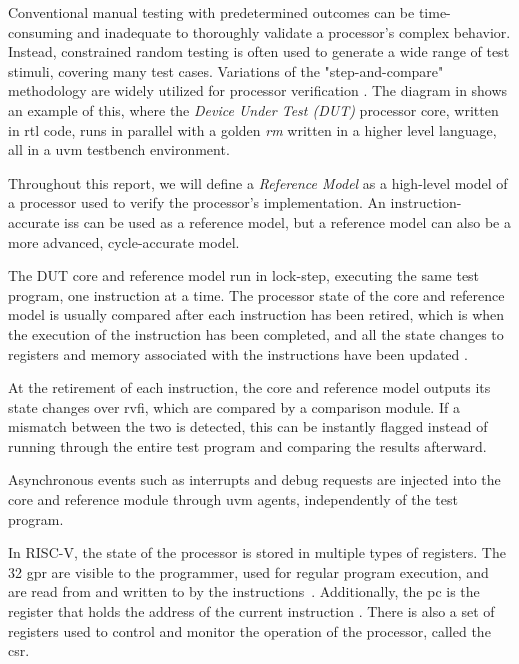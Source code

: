 Conventional manual testing with predetermined outcomes can be time-consuming and inadequate to thoroughly validate a processor's complex behavior. Instead, constrained random testing is often used to generate a wide range of test stimuli, covering many test cases. Variations of the "step-and-compare" methodology are widely utilized for processor verification \cite{taylorAdvancedRISCVVerification2023}. The diagram in  shows an example of this, where the \textit{Device Under Test (DUT)} processor core, written in \acrfull{rtl} code, runs in parallel with a golden \textit{\gls{rm}} written in a higher level language, all in a \acrfull{uvm} testbench environment. 

Throughout this report, we will define a \textit{Reference Model} as a high-level model of a processor used to verify the processor's implementation. An instruction-accurate \acrfull{iss} can be used as a reference model, but a reference model can also be a more advanced, cycle-accurate model. 

The DUT core and reference model run in lock-step, executing the same test program, one instruction at a time. 
The processor state of the core and reference model is usually compared after each instruction has been \gls{retired}, which is when the execution of the instruction has been completed, and all the state changes to registers and memory associated with the instructions have been updated \cite{taylorAdvancedRISCVVerification2023}. 

At the retirement of each instruction, the core and reference model outputs its state changes over \acrfull{rvfi}, which are compared by a comparison module. If a mismatch between the two is detected, this can be instantly flagged instead of running through the entire test program and comparing the results afterward. 

Asynchronous events such as interrupts and debug requests are injected into the core and reference module through \acrshort{uvm} agents, independently of the test program.

In RISC-V, the state of the processor is stored in multiple types of registers. The 32 \acrfull{gpr} are visible to the programmer, used for regular program execution, and are read from and written to by the instructions~\cite{watermanRISCVInstructionSet2019}. Additionally, the \acrfull{pc} is the register that holds the address of the current instruction \cite{watermanRISCVInstructionSet2019}. There is also a set of registers used to control and monitor the operation of the processor, called the \acrfull{csr}. 

